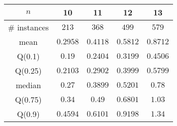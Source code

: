 \begin{tabular}{c|cccc} 
\hline 
$n$ & 10 & 11 & 12 & 13 \tabularnewline 
\hline 
\hline 
\# instances & $213$ & $368$ & $499$ & $579$ \tabularnewline 
mean & $0.2958$ & $0.4118$ & $0.5812$ & $0.8712$ \tabularnewline 
Q(0.1) & $0.19$ & $0.2404$ & $0.3199$ & $0.4506$ \tabularnewline 
Q(0.25) & $0.2103$ & $0.2902$ & $0.3999$ & $0.5799$ \tabularnewline 
median & $0.27$ & $0.3899$ & $0.5201$ & $0.78$ \tabularnewline 
Q(0.75) & $0.34$ & $0.49$ & $0.6801$ & $1.03$ \tabularnewline 
Q(0.9) & $0.4594$ & $0.6101$ & $0.9198$ & $1.34$ \tabularnewline 
\hline 
\end{tabular} 
\medskip{} 

